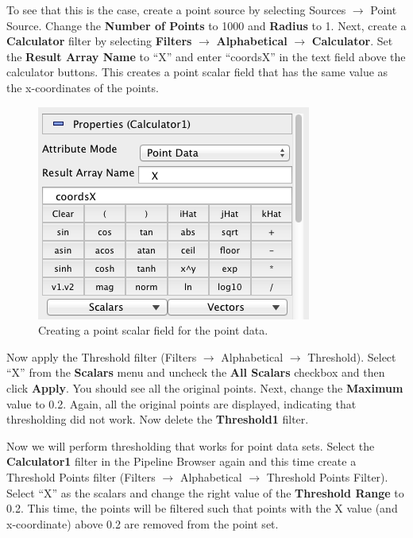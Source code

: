 \documentclass[12pt]{article}
\begin{document}
To see that this is the case, create a point source by selecting Sources $\rightarrow$ Point Source. Change the \textbf{Number of Points} to 1000 and \textbf{Radius} to 1. Next, create a \textbf{Calculator} filter by selecting \textbf{Filters} $\rightarrow$ \textbf{Alphabetical} $\rightarrow$ \textbf{Calculator}. Set the \textbf{Result Array Name} to ``X'' and enter ``coordsX'' in the text field above the calculator buttons. This creates a point scalar field that has the same value as the x-coordinates of the points.

\begin{figure}[htbp]
   \centering
   \includegraphics[scale=.5]{images/ThresholdPointsFilterCalculator.png} %
   \caption{Creating a point scalar field for the point data.}
   \label{fig:ThresholdPointsFilterCalculator}
\end{figure}

Now apply the Threshold filter (Filters $\rightarrow$ Alphabetical $\rightarrow$ Threshold). Select ``X'' from the \textbf{Scalars} menu and uncheck the \textbf{All Scalars} checkbox and then click \textbf{Apply}. You should see all the original points. Next, change the \textbf{Maximum} value to 0.2. Again, all the original points are displayed, indicating that thresholding did not work. Now delete the \textbf{Threshold1} filter.

Now we will perform thresholding that works for point data sets. Select the \textbf{Calculator1} filter in the Pipeline Browser again and this time create a Threshold Points filter (Filters $\rightarrow$ Alphabetical $\rightarrow$ Threshold Points Filter). Select ``X'' as the scalars and change the right value of the \textbf{Threshold Range} to 0.2. This time, the points will be filtered such that points with the X value (and x-coordinate) above 0.2 are removed from the point set.
\end{document}
